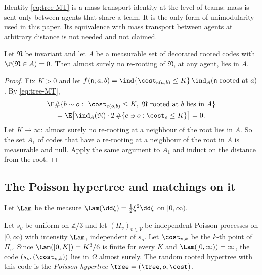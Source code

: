 Identity \eqref{eq:tree-MT} is a mass-transport identity at the level of teams: mass is sent
only between agents that share a team. It is the only form of unimodularity used in this
paper. Its equivalence with mass transport between agents at arbitrary distance is not needed
and not claimed.

\begin{lemma}\label{lem:tree-null}
Let $\mathfrak{N}$ be invariant and let $A$ be a measurable set of decorated rooted codes with
$\P(\mathfrak{N}\in A)=0$. Then almost surely no re-rooting of $\mathfrak{N}$, at any agent,
lies in $A$.
\end{lemma}

\begin{proof}
Fix $K>0$ and let $f(\mathfrak{n};a,b)=\ind\{\cost_{e(a,b)}\le K\}\,\ind_A(\mathfrak{n}\text{
rooted at }a)$. By \eqref{eq:tree-MT},
\begin{multline*}
  \E\#\{b\sim o:\ \cost_{e(o,b)}\le K,\ \mathfrak{N}\text{ rooted at }b\text{ lies in }A\}\\
  =\E\bigl[\ind_A(\mathfrak{N})\cdot 2\,\#\{e\ni o:\cost_e\le K\}\bigr]=0 .
\end{multline*}
Let $K\to\infty$: almost surely no re-rooting at a neighbour of the root lies in $A$. So the
set $A_1$ of codes that have a re-rooting at a neighbour of the root in $A$ is measurable and
null. Apply the same argument to $A_1$ and induct on the distance from the root.
\end{proof}

\subsection{The Poisson hypertree and matchings on it}\label{subsec:tree-poisson}

Let $\Lam$ be the measure $\Lam(\dd\xi)=\tfrac12\xi^2\dd\xi$ on $[0,\infty)$.

\begin{definition}\label{def:tree-poisson}
Let $s_o$ be uniform on $\mathbb{Z}/3$ and let $(\Pi_v)_{v\in V}$ be independent Poisson
processes on $[0,\infty)$ with intensity $\Lam$, independent of $s_o$. Let $\cost_{v,k}$ be the
$k$-th point of $\Pi_v$. Since $\Lam([0,K])=K^3/6$ is finite for every $K$ and
$\Lam([0,\infty))=\infty$, the code $(s_o,(\cost_{v,k}))$ lies in $\Omega$ almost surely. The
random rooted hypertree with this code is the \emph{Poisson hypertree}
$\tree=(\tree,o,\cost)$.
\end{definition}

